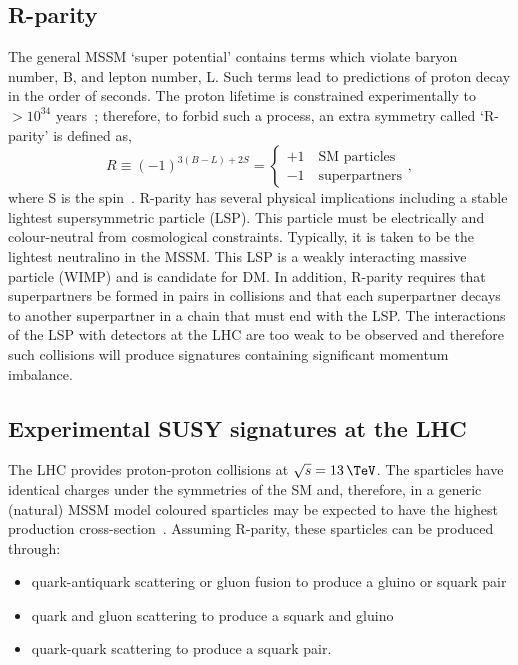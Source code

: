 \subsection{R-parity}

The general MSSM `super potential' contains terms which violate baryon number, B, and lepton number, 
L. Such terms lead to predictions of proton decay in the order of seconds. 
The proton lifetime is constrained experimentally to $> 10^{34}$ years~\cite{protonDecay};
therefore, to forbid such a process, an extra symmetry called `R-parity' is defined as,
\begin{equation}
R \equiv (-1)^{3(B-L)+2S} = 
\begin{cases}
+ 1\quad \text{SM particles}\\
- 1\quad \text{superpartners}
\end{cases},
\end{equation}
where S is the spin~\cite{SUSYP}. R-parity has several physical implications including a stable lightest supersymmetric 
particle (LSP). This particle must be electrically and colour-neutral from cosmological constraints.
Typically, it is taken to be the lightest neutralino in the MSSM.
This LSP is a weakly interacting massive particle (WIMP) and is candidate for DM. 
In addition, R-parity requires that superpartners be
formed in pairs in collisions and that each superpartner decays to another superpartner
in a chain that must end with the LSP. The interactions of the LSP with detectors at the LHC
are too weak to be observed and therefore such collisions will produce signatures 
containing significant momentum imbalance.

\subsection{Experimental SUSY signatures at the LHC}

The LHC provides proton-proton collisions at $\sqrt{s} = 13\,\TeV$. The sparticles have identical charges under 
the symmetries of the SM and, therefore, in a generic (natural) MSSM model 
coloured sparticles may be expected to have the highest production 
cross-section~\cite{susyprod}. Assuming R-parity, these sparticles can be produced through:

\begin{itemize}
\item quark-antiquark scattering or gluon fusion to produce a gluino or squark pair
\item quark and gluon scattering to produce a squark and gluino
\item quark-quark scattering to produce a squark pair.
\end{itemize}

